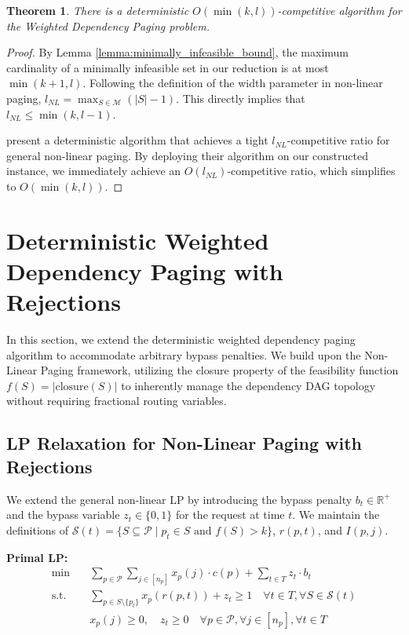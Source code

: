 \documentclass[a4paper]{article}
\newtheorem{theorem}{Theorem}    %
\begin{document}
\begin{theorem}
There is a deterministic $O(\min(k,l))$-competitive algorithm for the Weighted Dependency Paging problem.
\end{theorem}
\begin{proof}
By Lemma \ref{lemma:minimally_infeasible_bound}, the maximum cardinality of a minimally infeasible set in our reduction is at most $\min(k+1, l)$. Following the definition of the width parameter in non-linear paging, $l_{NL} = \max_{S \in \mathcal{M}} (|S| - 1)$. This directly implies that $l_{NL} \le \min(k, l-1)$. 

\cite{DoronAradetal2024} present a deterministic algorithm that achieves a tight $l_{NL}$-competitive ratio for general non-linear paging. By deploying their algorithm on our constructed instance, we immediately achieve an $O(l_{NL})$-competitive ratio, which simplifies to $O(\min(k, l))$.
\end{proof}
\section{Deterministic Weighted Dependency Paging with Rejections}
\label{sec:deterministic_weighted_rejections}

In this section, we extend the deterministic weighted dependency paging algorithm to accommodate arbitrary bypass penalties. We build upon the Non-Linear Paging framework, utilizing the closure property of the feasibility function $f(S) = |\text{closure}(S)|$ to inherently manage the dependency DAG topology without requiring fractional routing variables.

\subsection{LP Relaxation for Non-Linear Paging with Rejections}
We extend the general non-linear LP by introducing the bypass penalty $b_t \in \mathbb{R}^+$ and the bypass variable $z_t \in \{0,1\}$ for the request at time $t$. We maintain the definitions of $\mathcal{S}(t) = \{S \subseteq \mathcal{P} \mid p_t \in S \text{ and } f(S) > k\}$, $r(p,t)$, and $I(p,j)$.

\noindent\textbf{Primal LP:}
\begin{align*}
\min \quad & \sum_{p \in \mathcal{P}} \sum_{j \in [n_p]} x_p(j) \cdot c(p) + \sum_{t \in T} z_t \cdot b_t \\
\text{s.t.} \quad & \sum_{p \in S \setminus \{p_t\}} x_p(r(p,t)) + z_t \ge 1 \quad \forall t \in T, \forall S \in \mathcal{S}(t) \\
& x_p(j) \ge 0, \quad z_t \ge 0 \quad \forall p \in \mathcal{P}, \forall j \in [n_p], \forall t \in T
\end{align*}
\end{document}
